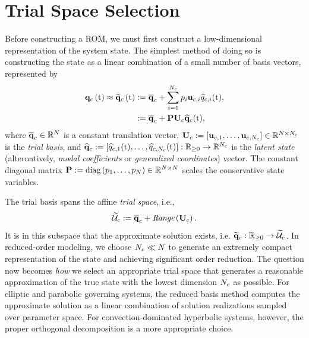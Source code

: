 \section{Trial Space Selection}
%
Before constructing a ROM, we must first construct a low-dimensional representation of the system state. The simplest method of doing so is constructing the state as a linear combination of a small number of basis vectors, represented by
%
\begin{equation}\label{eq:consSolApprox}
    \begin{aligned}
        \consFunc{\timeVar} \approx \consFuncRom{\timeVar} &\defEq \consVecCent + \sum_{\dummyIdx=1}^{\numConsModes} \consScaleVar_\dummyIdx \consTrialVecIdx \consVarCoefIdx (\timeVar), \\
        &\defEq \consAffineMap(\timeVar),
    \end{aligned}
\end{equation}
%
where $\mathbf{\overline{q}}_{c} \in \mathbb{R}^{N}$ is a constant translation vector, $\consTrial \defEq \left[\consTrialVec{1},\hdots,\consTrialVec{\numConsModes}\right] \inRTwo{\numDOF}{\numConsModes}$ is the \textit{trial basis}, and $\mathbf{\widehat{q}}_{c} := \left[\widehat{q}_{c,1}(\text{t}),\hdots,\widehat{q}_{c,N_c}(\text{t})\right]: \mathbb{R}_{\ge 0} \rightarrow \mathbb{R}^{N_c}$ is the \textit{latent state} (alternatively, \textit{modal coefficients} or \textit{generalized coordinates}) vector. The constant diagonal matrix $\consScale \defEq \text{diag}\left(\consScaleVar_1, \hdots , \consScaleVar_{\numDOF}\right) \inRTwo{\numDOF}{\numDOF}$ scales the conservative state variables.

The trial basis spans the affine \textit{trial space}, i.e.,
%
\begin{equation}
    \consTrialSpace \defEq \consVecCent + \textit{Range}\left(\consTrial\right).
\end{equation}
%
It is in this subspace that the approximate solution exists, i.e. $\funcMap{\consVecRom}{\nonnegReals}{\consTrialSpace}$. In reduced-order modeling, we choose $N_c \ll N$ to generate an extremely compact representation of the state and achieving significant order reduction. The question now becomes \textit{how} we select an appropriate trial space that generates a reasonable approximation of the true state with the lowest dimension $N_c$ as possible. For elliptic and parabolic governing systems, the reduced basis method computes the approximate solution as a linear combination of solution realizations sampled over parameter space. For convection-dominated hyperbolic systems, however, the proper orthogonal decomposition is a more appropriate choice.

